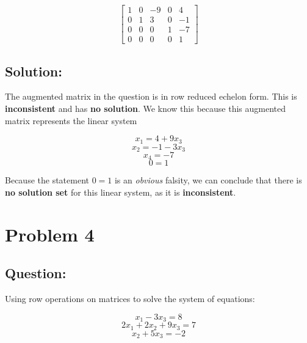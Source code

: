 \documentclass{article}
\begin{document}
\[
\begin{bmatrix}
1 & 0 & -9 & 0 & 4 \\
0 & 1 & 3 & 0 & -1 \\
0 & 0 & 0 & 1 & -7 \\
0 & 0 & 0 & 0 & 1
\end{bmatrix}
\] 

\subsection*{Solution:}

The augmented matrix in the question is in row reduced echelon form. This is \textbf{inconsistent} and has \textbf{no solution}. We know this because this augmented matrix represents the linear system 

$$x_{1} = 4 + 9x_{3}$$
$$x_{2} = -1 - 3x_{3}$$
$$x_{4} = -7$$
$$0 = 1$$

Because the statement $0 = 1$ is an \textit{obvious} falsity, we can conclude that there is \textbf{no solution set} for this linear system, as it is \textbf{inconsistent}.

\section*{Problem 4}
\subsection*{Question:}
Using row operations on matrices to solve the system of equations: 

$$x_{1} - 3x_{3} = 8$$
$$2x_{1} + 2x_{2} + 9x_{3} = 7$$
$$x_{2} + 5x_{3} = -2$$
\end{document}
